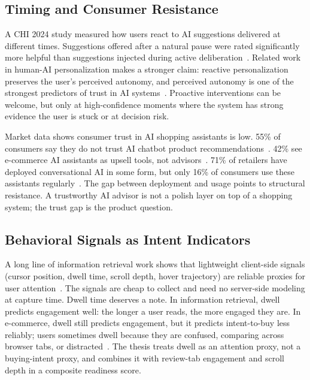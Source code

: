 \subsection{Timing and Consumer Resistance}
\label{subsec:bg-timing}

A CHI 2024 study measured how users react to AI suggestions
delivered at different times. Suggestions offered after a natural
pause were rated significantly more helpful than suggestions
injected during active deliberation~\cite{CHI2024Timing}. Related
work in human-AI personalization makes a stronger claim: reactive
personalization preserves the user's perceived autonomy, and
perceived autonomy is one of the strongest predictors of trust in
AI systems~\cite{ProactiveReactivePersonalization}. Proactive
interventions can be welcome, but only at high-confidence moments
where the system has strong evidence the user is stuck or at
decision risk.

Market data shows consumer trust in AI shopping assistants is
low. 55\% of consumers say they do not trust AI chatbot product
recommendations~\cite{ConsumerDistrust2025}. 42\% see e-commerce
AI assistants as upsell tools, not advisors~\cite{AIUpsell2025}.
71\% of retailers have deployed conversational AI in some form,
but only 16\% of consumers use these assistants
regularly~\cite{ConsumerResistanceAI}. The gap between deployment
and usage points to structural resistance. A trustworthy AI
advisor is not a polish layer on top of a shopping system; the
trust gap is the product question.

\subsection{Behavioral Signals as Intent Indicators}
\label{subsec:bg-behavior-signals}

A long line of information retrieval work shows that lightweight
client-side signals (cursor position, dwell time, scroll depth,
hover trajectory) are reliable proxies for user
attention~\cite{SIGIR2020Cursor}. The signals are cheap to
collect and need no server-side modeling at capture time. Dwell
time deserves a note. In information retrieval, dwell predicts
engagement well: the longer a user reads, the more engaged they
are. In e-commerce, dwell still predicts engagement, but it
predicts intent-to-buy less reliably; users sometimes dwell
because they are confused, comparing across browser tabs, or
distracted~\cite{DwellTimeEngagement2022}. The thesis treats
dwell as an attention proxy, not a buying-intent proxy, and
combines it with review-tab engagement and scroll depth in a
composite readiness score.

